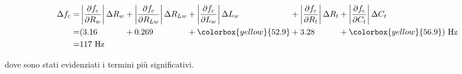 \documentclass[12pt,italian]{article}
\begin{document}
\begin{equation*}
	\begin{alignedat}{5}
		\Delta f_{c} = & \left|\frac{\partial f_{c}}{\partial R_{w}}\right| \Delta R_{w} &  & +  \left|\frac{\partial f_{c}}{\partial R_{Lw}}\right| \Delta R_{Lw} &  & + \left|\frac{\partial f_{c}}{\partial L_{w}}\right| \Delta L_{w} &  & + \left|\frac{\partial f_{c}}{\partial R_{t}}\right| \Delta R_{t} &  & + \left|\frac{\partial f_{c}}{\partial C_{t}}\right| \Delta C_{t} \\
		=              & ( 3.16                                                          &  & +  0.269                                                             &  & + \colorbox{yellow}{52.9}                                         &  & + 3.28                                                            &  & + \colorbox{yellow}{56.9} ) \text{ Hz}                            \\
		=              & 117 \text{ Hz}
	\end{alignedat}
\end{equation*}

\noindent
dove sono stati evidenziati i termini più significativi.
\end{document}
